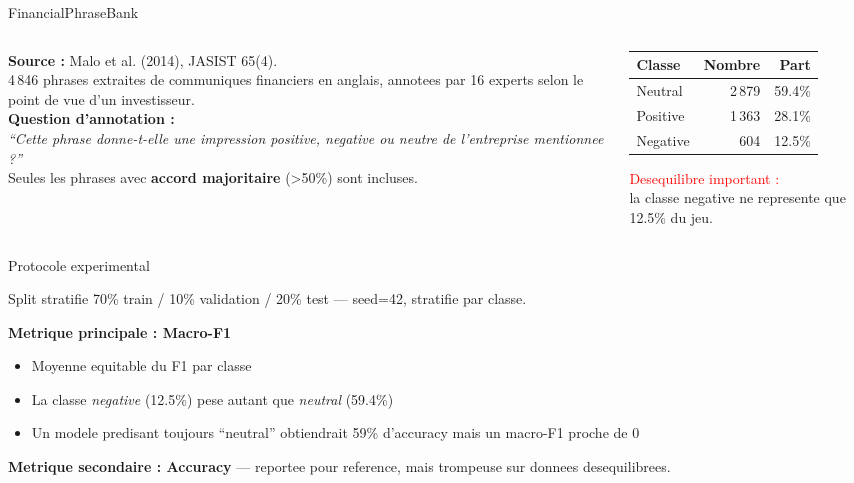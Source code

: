 \documentclass[aspectratio=169, 11pt]{beamer}
\begin{document}
\begin{frame}{FinancialPhraseBank}
  \begin{columns}[T]
    \begin{column}{0.55\textwidth}
      \textbf{Source :} Malo et al. (2014), JASIST 65(4).\\[6pt]
      4\,846 phrases extraites de communiques financiers en anglais,
      annotees par 16 experts selon le point de vue d'un investisseur.\\[6pt]
      \textbf{Question d'annotation :}\\
      \emph{``Cette phrase donne-t-elle une impression positive,
      negative ou neutre de l'entreprise mentionnee ?''}\\[6pt]
      Seules les phrases avec \textbf{accord majoritaire} (>50\%) sont incluses.
    \end{column}
    \begin{column}{0.4\textwidth}
      \begin{table}
        \centering\small
        \begin{tabular}{lrr}
          \toprule
          Classe   & Nombre & Part \\
          \midrule
          Neutral  & 2\,879 & 59.4\% \\
          Positive & 1\,363 & 28.1\% \\
          Negative &    604 & 12.5\% \\
          \bottomrule
        \end{tabular}
      \end{table}
      \vspace{0.3cm}
      {\small\textcolor{red}{Desequilibre important :}\\la classe negative ne represente que 12.5\% du jeu.}
    \end{column}
  \end{columns}
\end{frame}

\begin{frame}{Protocole experimental}
  \begin{block}{Split stratifie}
    70\% train / 10\% validation / 20\% test --- seed=42, stratifie par classe.
  \end{block}
  \vspace{0.3cm}
  \textbf{Metrique principale : Macro-F1}
  \begin{itemize}
    \item Moyenne equitable du F1 par classe
    \item La classe \emph{negative} (12.5\%) pese autant que \emph{neutral} (59.4\%)
    \item Un modele predisant toujours ``neutral'' obtiendrait 59\% d'accuracy mais un macro-F1 proche de 0
  \end{itemize}
  \vspace{0.3cm}
  \textbf{Metrique secondaire : Accuracy} --- reportee pour reference, mais trompeuse sur donnees desequilibrees.
\end{frame}
\end{document}
